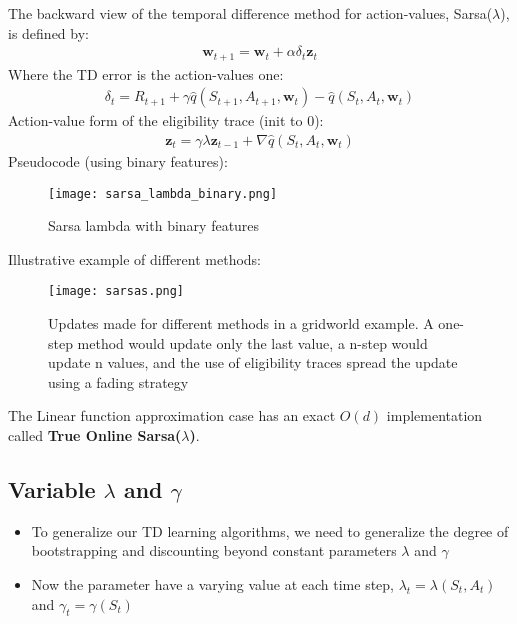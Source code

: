 \documentclass[sutton_barto_notes.tex]{subfiles}
\begin{document}
 The backward view of the temporal difference method for action-values, Sarsa($\lambda$), is defined by: 
\begin{align}
\mathbf{w}_{t+1} = \mathbf{w}_{t} + \alpha \delta_t \mathbf{z}_{t}  \label{eq:12.14}\tag{12.14}
\end{align}
 Where the TD error is the action-values one: 
\begin{align}
\delta_t = R_{t+1} + \gamma \hat{q}(S_{t+1}, A_{t+1}, \mathbf{w}_{t}) - \hat{q}(S_{t}, A_{t}, \mathbf{w}_{t})  \label{eq:12.15}\tag{12.15}
\end{align}
 Action-value form of the eligibility trace (init to 0): 
\begin{align}
\mathbf{z}_{t} = \gamma \lambda \mathbf{z}_{t-1} + \nabla \hat{q}(S_t, A_t, \mathbf{w}_{t})  \label{eq:12.16}\tag{12.16}
\end{align}
 Pseudocode (using binary features): 
\begin{figure}[h!]
    \centering
     \texttt{[image: sarsa\_lambda\_binary.png]}
    \caption{ Sarsa lambda with binary features }
\end{figure}

 Illustrative example of different methods: 
\begin{figure}[h!]
    \centering
     \texttt{[image: sarsas.png]}
    \caption{ Updates made for different methods in a gridworld example. A one-step method would update only the last value, a n-step would update n values, and the use of eligibility traces spread the update using a fading strategy }
\end{figure}

 The Linear function approximation case has an exact $O(d)$ implementation called \textbf{True Online Sarsa($\lambda$)}. 


\subsection{Variable $\lambda$ and $\gamma$}

\begin{itemize}
\item To generalize our TD learning algorithms, we need to generalize the degree of bootstrapping and discounting beyond constant parameters $\lambda$ and $\gamma$ 
\item Now the parameter have a varying value at each time step, $\lambda_t = \lambda(S_t, A_t)$ and $\gamma_t = \gamma(S_t)$ 
\end{itemize}
\end{document}
